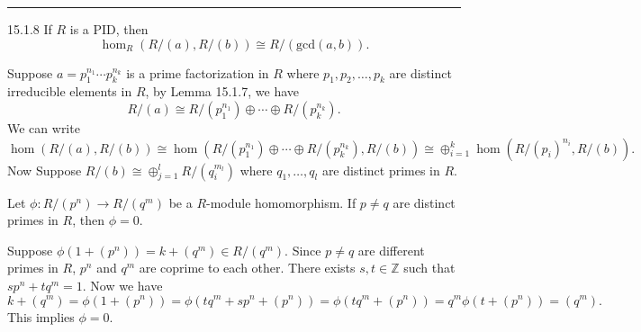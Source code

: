 \documentclass[a4paper, 12pt]{article}
\begin{document}
\noindent\rule{7in}{2.8pt}
\newpage 
\begin{problem}{15.1.8}
If \(R\) is a PID, then 
\[\hom_R(R/(a),R/(b))\cong R/(\text{gcd}(a,b)).\]
\end{problem}
\begin{solution}
Suppose \(a=p_1^{n_1}\cdots p_k^{n_k}\) is a prime factorization in \(R\) where \(p_1,p_2,\ldots,p_k\) are distinct irreducible elements in \(R\), by Lemma 15.1.7, we have 
\[R/(a)\cong R/(p_1^{n_1})\oplus \cdots \oplus R/(p_k^{n_k}).\]
We can write 
\[\hom (R/(a),R/(b))\cong \hom (R/(p_1^{n_1})\oplus \cdots\oplus R/(p_k^{n_k}), R/(b))\cong \oplus_{i=1}^k\hom (R/(p_i)^{n_i},R/(b)).\]
Now Suppose \(R/(b)\cong \oplus_{j=1}^l R/(q_i^{m_l})\) where \(q_1,\ldots,q_l\) are distinct primes in \(R\). 
\begin{claim}
Let \(\phi:R/(p^n)\rightarrow R/(q^m)\) be a \(R\)-module homomorphism. If \(p\neq q\) are distinct primes in \(R\), then \(\phi=0\).
\end{claim}
\begin{claimproof}
Suppose \(\phi(1+(p^n))=k+(q^m)\in R/(q^m)\). Since \(p\neq q\) are different primes in \(R\), \(p^n\) and \(q^m\) are coprime to each other. There exists \(s,t\in \mathbb{Z}\) such that 
\(sp^n+tq^m=1\). Now we have 
\[k+(q^m)=\phi(1+(p^n))=\phi(tq^m+sp^n+(p^n))=\phi(tq^m+(p^n))=q^m\phi(t+(p^n))=(q^m).\]
This implies \(\phi=0\). 
\end{claimproof}


\end{solution}
\end{document}
